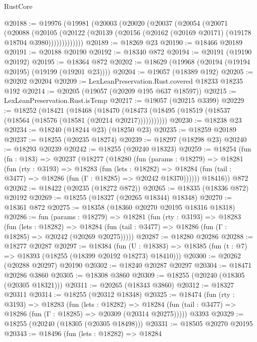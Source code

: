 \begin{lexlean}{RustCore}
\begin{coremodule}
@20188 := @19976
    (@19981
      (@20003
        (@20020
          (@20037
            (@20054
              (@20071
                (@20088
                  (@20105
                    (@20122
                      (@20139 (@20156 (@20162 (@20169 @20171) (@19178 @18704 @3980)))))))))))))
@20189 := @18269 @23
@20190 := @18466 @20189
@20191 := @20188 @20190
@20192 := @18340 @872
@20194 := @20191 (@19190 @20192)
@20195 := @18364 @872
@20202 := @18629 (@19968 (@20194 (@19194 @20195) (@19199 (@19201 @23))))
@20204 := @19057 (@18389 @192)
@20205 := @20202 @20204
@20209 := LexLeanPreservation.Rust.covered @18233 @18235 @192
@20214 := @20205 (@19057 (@20209 @195 @637 @18597))
@20215 := LexLeanPreservation.Rust.isTemp
@20217 := @19057 (@20215 @3399)
@20229 := @18252
    (@18421
      (@18468
        (@18470 (@18473 (@18495 (@18519 (@18537 (@18564 (@18576 (@18581 (@20214 @20217)))))))))))
@20230 := @18238 @23
@20234 := @18240 (@18244 @23) (@18250 @23)
@20235 := @18259 @20189
@20237 := @18255 (@20235 @18274)
@20239 := @18297 (@18298 @23)
@20240 := @18293 @20239
@20242 := @18255 (@20240 @18323)
@20259 := @18254
    (fun (fn : @183) =>
    @20237
      (@18277
        (@18280
          (fun (params : @18279) =>
          @18281
            (fun (rty : @3193) =>
            @18283
              (fun (lets : @18282) =>
              @18284 (fun (tail : @3477) => @18286 (fun (Γ : @18285) => @20242 @18370))))))
        @18416))
    @872
@20262 := @18422 (@20235 (@18272 @872))
@20265 := @18335 (@18336 @872) @20192
@20269 := @18255 (@18327 (@20265 @18344) @18348)
@20270 := @18361 @872
@20275 := @18358 (@18360 @20270 @20195 @18316 @18318)
@20286 := fun (params : @18279) =>
  @18281
    (fun (rty : @3193) =>
    @18283
      (fun (lets : @18282) =>
      @18284 (fun (tail : @3477) => @18286 (fun (Γ : @18285) => @20242 (@20269 @20275)))))
@20287 := @18280 @20286
@20288 := @18277 @20287
@20297 := @18384
    (fun (U : @18383) => @18385 (fun (t : @7) => @18393 (@18255 (@18399 @20192 @18273) @18410)))
@20300 := @20262 (@20288 @20297) @20190
@20302 := @18240 @20287 @20297
@20304 := @18471 @20286 @3860
@20305 := @18308 @3860
@20309 := @18255 (@20240 (@18305 (@20305 @18321)))
@20311 := @20265 (@18343 @3860)
@20312 := @18327 @20311
@20314 := @18255 (@20312 @18348)
@20325 := @18474
    (fun (rty : @3193) =>
    @18283
      (fun (lets : @18282) =>
      @18284 (fun (tail : @3477) => @18286 (fun (Γ : @18285) => @20309 (@20314 @20275)))))
    @3393
@20329 := @18255 (@20240 (@18305 (@20305 @18498)))
@20331 := @18505 @20270 @20195
@20343 := @18496
    (fun (lets : @18282) =>
    @18284

\end{coremodule}
\end{lexlean}
